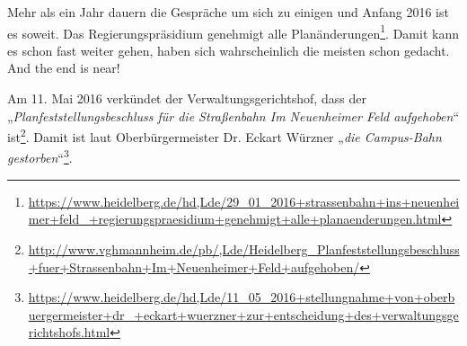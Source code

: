 Mehr als ein Jahr dauern die Gespräche um sich zu einigen und Anfang 2016 ist es soweit. Das Regierungspräsidium genehmigt alle Planänderungen\footnote{\url{https://www.heidelberg.de/hd,Lde/29_01_2016+strassenbahn+ins+neuenheimer+feld_+regierungspraesidium+genehmigt+alle+planaenderungen.html}}. Damit kann es schon fast weiter gehen, haben sich wahrscheinlich die meisten schon gedacht. And the end is near!

Am 11. Mai 2016 verkündet der Verwaltungsgerichtshof, dass der „\textit{Planfeststellungsbeschluss für die Straßenbahn Im Neuenheimer Feld aufgehoben}“ ist\footnote{\url{http://www.vghmannheim.de/pb/,Lde/Heidelberg_Planfeststellungsbeschluss+fuer+Strassenbahn+Im+Neuenheimer+Feld+aufgehoben/}}. Damit ist laut Oberbürgermeister Dr. Eckart Würzner „\textit{die Campus-Bahn gestorben}“\footnote{\url{https://www.heidelberg.de/hd,Lde/11_05_2016+stellungnahme+von+oberbuergermeister+dr_+eckart+wuerzner+zur+entscheidung+des+verwaltungsgerichtshofs.html}}.
